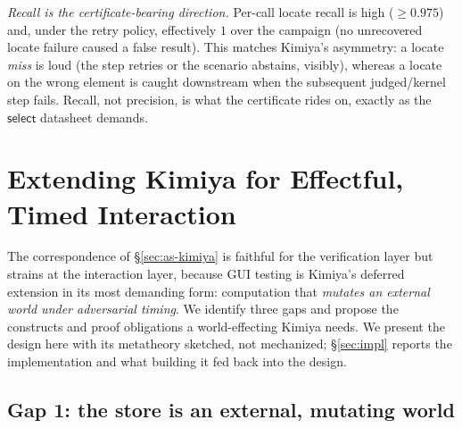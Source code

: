 \documentclass[acmsmall,screen,nonacm]{acmart}
\newcommand{\select}{\mathsf{select}}
\theoremstyle{acmdefinition}%
\theoremstyle{acmplain}%
\begin{document}
\emph{Recall is the certificate-bearing direction.} Per-call locate recall
is high ($\ge 0.975$) and, under the retry policy, effectively $1$ over
the campaign (no unrecovered locate failure caused a false result). This
matches Kimiya's asymmetry: a locate \emph{miss} is loud (the step
retries or the scenario abstains, visibly), whereas a locate on the wrong
element is caught downstream when the subsequent judged/kernel step fails.
Recall, not precision, is what the certificate rides on, exactly as the
$\select$ datasheet demands.

\section{Extending Kimiya for Effectful, Timed Interaction}
\label{sec:extend}

The correspondence of \S\ref{sec:as-kimiya} is faithful for the
verification layer but strains at the interaction layer, because GUI
testing is Kimiya's deferred extension in its most demanding form:
computation that \emph{mutates an external world under adversarial
timing}. We identify three gaps and propose the constructs and proof
obligations a world-effecting Kimiya needs. We present the design here with its
metatheory sketched, not mechanized; \S\ref{sec:impl} reports the
implementation and what building it fed back into the design.

\subsection{Gap 1: the store is an external, mutating world}
\end{document}
